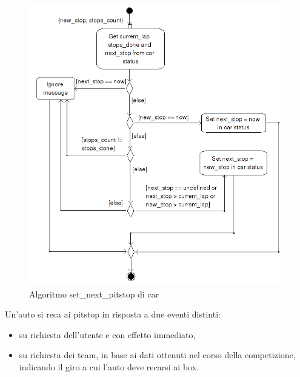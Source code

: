 \documentclass[11pt,a4paper]{report}
\begin{document}
\begin{center}
\begin{figure}
\includegraphics[width=\textwidth]{diagrammi/NextPitstop}
\caption{Algoritmo set\_next\_pitstop di car}
\label{fig:nextPitstop}
\end{figure}
\end{center}

Un'auto si reca ai pitstop in risposta a due eventi distinti:
\begin{itemize}
\item su richiesta dell'utente e con effetto immediato,
\item su richiesta dei team, in base ai dati ottenuti nel corso della competizione, indicando il giro a cui l'auto deve recarsi ai box.
\end{itemize}
\end{document}
